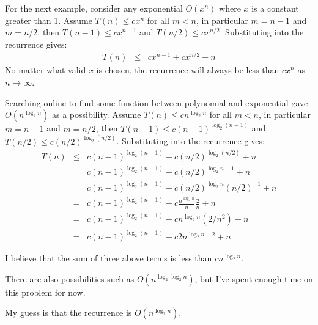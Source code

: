 For the next example, consider any exponential $O(x^n)$ where $x$ is a constant greater than 1.  Assume $T(n) \leq cx^n$ for all $m < n$, in particular $m = n - 1$ and $m = n/2$, then $T(n-1) \leq cx^{n-1}$ and $T(n/2) \leq cx^{n/2}$.  Substituting into the recurrence gives:
\begin{eqnarray*}
	T(n) & \leq & cx^{n-1} + cx^{n/2} + n
\end{eqnarray*}
No matter what valid $x$ is chosen, the recurrence will always be less than $cx^n$ as $n \rightarrow \infty$.

Searching online to find some function between polynomial and exponential gave $O(n^{\log_2 n})$ as a possibility.  Assume $T(n) \leq cn^{\log_2 n}$ for all $m < n$, in particular $m = n - 1$ and $m = n/2$, then $T(n-1) \leq c(n-1)^{\log_2(n - 1)}$ and $T(n/2) \leq c(n/2)^{\log_2 (n/2)}$.  Substituting into the recurrence gives:
\begin{eqnarray*}
	T(n) & \leq & c(n-1)^{\log_2(n-1)} + c(n/2)^{\log_2 (n/2)} + n \\
	 & = & c(n-1)^{\log_2(n-1)} + c(n/2)^{\log_2 n - 1} + n \\
	 & = & c(n-1)^{\log_2(n-1)} + c(n/2)^{\log_2 n}(n/2)^{-1} + n \\
	 & = & c(n-1)^{\log_2(n-1)} + c\frac{n^{\log_2 n}}{n}\frac{2}{n} + n \\
	 & = & c(n-1)^{\log_2(n-1)} + cn^{\log_2 n}(2/n^2) + n \\
	 & = & c(n-1)^{\log_2(n-1)} + c2n^{\log_2 n - 2} + n
\end{eqnarray*}

I believe that the sum of three above terms is less than $cn^{\log_2 n}$.

There are also possibilities such as $O(n^{\log_2 \log_2 n})$, but I've spent enough time on this problem for now.

My guess is that the recurrence is $O(n^{\log_2 n})$.
